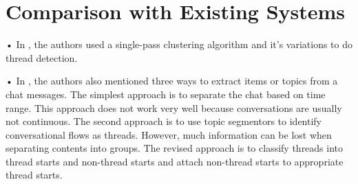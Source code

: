 \section{Comparison with Existing Systems}

 
	• In \cite{10.1145/1148170.1148180:1}, the authors used a single-pass clustering algorithm and it's variations to do thread detection.
	 
	• In \cite{khan2002mining:2}, the authors also mentioned three ways to extract items or topics from a chat messages. The simplest approach is to separate the chat based on time range. This approach does not work very well because conversations are usually not continuous. The second approach is to use topic segmentors to identify conversational flows as threads. However, much information can be lost when separating contents into groups. The revised approach is to classify threads into thread starts and non-thread starts and attach non-thread starts to appropriate thread starts. 